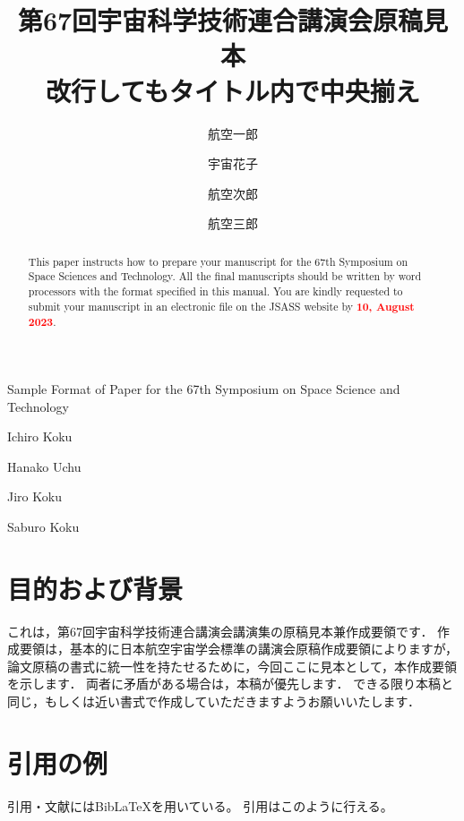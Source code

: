 \documentclass{jsass-ukaren}
\begin{document}
\title{第67回宇宙科学技術連合講演会原稿見本\\改行してもタイトル内で中央揃え}{Sample Format of Paper for the 67th Symposium on Space Science and Technology}

\author[1]{航空一郎}{Ichiro Koku}
\author[1]{宇宙花子}{Hanako Uchu}
\author[2]{航空次郎}{Jiro Koku}
\author[1]{航空三郎}{Saburo Koku}



\begin{abstract}
  This paper instructs how to prepare your manuscript for the 67th Symposium on Space Sciences and Technology.
  All the final manuscripts should be written by word processors with the format specified in this manual.
  You are kindly requested to submit your manuscript in an electronic file on the JSASS website by \textcolor{red}{\textbf{10, August 2023}}.
\end{abstract}

\maketitle


\section{目的および背景}
  これは，第67回宇宙科学技術連合講演会講演集の原稿見本兼作成要領です．
  作成要領は，基本的に日本航空宇宙学会標準の講演会原稿作成要領によりますが，論文原稿の書式に統一性を持たせるために，今回ここに見本として，本作成要領を示します．
  両者に矛盾がある場合は，本稿が優先します．
  できる限り本稿と同じ，もしくは近い書式で作成していただきますようお願いいたします．

\section{引用の例}
  引用・文献にはBib\LaTeX を用いている。
  引用はこのように行える\cite{article_en_example,event_ja_example,online_ja_example}。


\printbibliography[title=参考文献]
\end{document}
